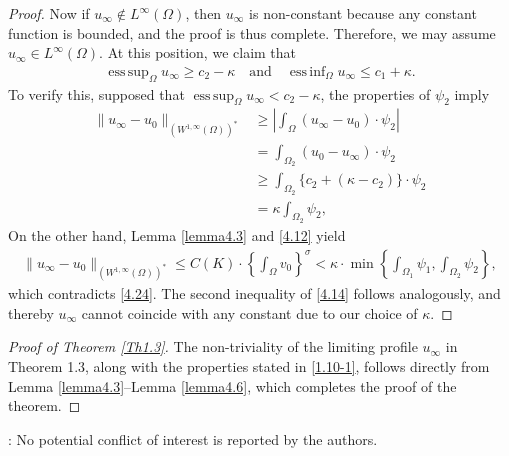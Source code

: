 \documentclass[12pt]{article}
\DeclareMathOperator{\esssup}{ess\,sup}
\DeclareMathOperator{\essinf}{ess\,inf}
\theoremstyle{plain}
\theoremstyle{definition}
\numberwithin{equation}{section}
\begin{document}
\begin{proof}
Now if $u_{\infty}\not\in L^\infty(\Omega)$, then $u_{\infty} $ is non-constant   because any constant function is bounded, and the proof is thus complete.  Therefore, we may assume $u_{\infty} \in L^\infty(\Omega)$.  At this position, we claim  that
     \begin{align}\label{4.14}
        \esssup_{\Omega} u_{\infty}\geq c_{2}-\kappa\quad\text{and} \quad\essinf_{\Omega} u_{\infty}\leq c_{1}+\kappa.
    \end{align}
To verify this, supposed that %
     $\esssup_{\Omega} u_{\infty} < c_2 - \kappa$,  the properties of $\psi_2$ imply
\begin{align}\label{4.24}
    \|u_{\infty}-u_{0}\|_{(W^{1,\infty}(\Omega))^{*}}
    &\geq \left| \int_{\Omega} (u_{\infty} - u_0)\cdot \psi_2 \right| \nonumber\\
    &=\int_{\Omega_2}(u_{0}-u_{\infty})\cdot\psi_{2}\\
       &\geq\int_{\Omega_2}\{c_2+(\kappa-c_{2})\}\cdot\psi_{2} \nonumber\\
    &=\kappa\int_{\Omega_2}\psi_2,  \nonumber
\end{align}
On the other hand, Lemma \ref{lemma4.3} and \eqref{4.12} yield
\begin{align}\label{4.13}
    \|u_{\infty}-u_0\|_{(W^{1,\infty}(\Omega))^*} \leq  C(K)\cdot \left\{\int_{\Omega} v_{0}\right\}^{\sigma}
    <  \kappa \cdot\min\left \{\int_{\Omega_1}\psi_1,\int_{\Omega_2}\psi_2\right\},
\end{align}
which contradicts \eqref{4.24}.  The second inequality of \eqref{4.14}  follows analogously,  and thereby  $u_{\infty}$
 cannot coincide with any constant due to our choice of $\kappa$.
\end{proof}
\begin{proof}[Proof of Theorem \ref{Th1.3}] The non-triviality of the limiting profile $u_\infty$ in Theorem 1.3,
 along with the properties stated in \eqref{1.10-1},  follows directly from Lemma \ref{lemma4.3}--Lemma \ref{lemma4.6}, which completes the proof of the theorem.
\end{proof}

\vspace{.7cm}


\vspace{.3cm}

:
No potential conflict of interest is reported by the authors.
\end{document}

